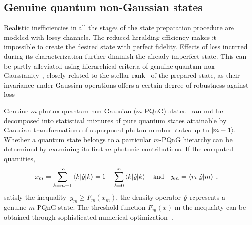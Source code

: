 \documentclass{article}
\begin{document}
%

%
%

\subsection*{Genuine quantum non-Gaussian states}

Realistic inefficiencies in all the stages of the state preparation procedure are modeled with lossy channels. The reduced heralding efficiency makes it impossible to create the desired state with perfect fidelity. Effects of loss incurred during its characterization further diminish the already imperfect state. This can be partly alleviated using hierarchical criteria of genuine quantum non-Gaussianity~\cite{lachman2019}, closely related to the stellar rank~\cite{chabaud2020,walschaers2021,fiurasek2022} of the prepared state, as their invariance under Gaussian operations offers a certain degree of robustness against loss~\cite{lachman2019}.

Genuine $m$-photon quantum non-Gaussian ($m$-PQnG) states~\cite{lachman2019} can not be decomposed into statistical mixtures of pure quantum states attainable by Gaussian transformations of superposed photon number states up to ${\ket{m - 1}}$. Whether a quantum state belongs to a particular $m$-PQnG hierarchy can be determined by examining its first $m$ photonic contributions. If the computed quantities,
%
\begin{equation}
  x_{m} 
    = \sum_{k = m + 1}^{\infty} 
      \braket{k | \hat{\varrho} | k}
    = 1 - \sum_{k = 0}^{m} 
      \braket{k | \hat{\varrho} | k}
  \quad\text{and}\quad
  y_{m} = \braket{m | \hat{\varrho} | m}
  \;\text{,}
\end{equation}
%
satisfy the inequality~${y_{m} \geq F_{m} (x_{m})}$, the density operator $\hat{\varrho}$ represents a genuine $m$-PQnG state. The threshold function $F_{m}(x)$ in the inequality can be obtained through sophisticated numerical optimization~\cite{lachman2019,fiurasek2022}.

%
\end{document}
